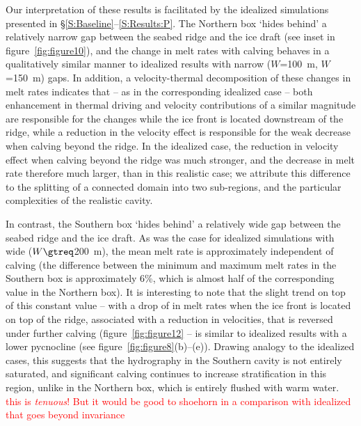 \documentclass[draft]{agujournal2019}
\newcommand{\red}[1]{\textcolor{red}{#1}}
\begin{document}
Our interpretation of these results is facilitated by the idealized simulations presented in \S\ref{S:Baseline}--\ref{S:Results:P}. The Northern box `hides behind' a relatively narrow gap between the seabed ridge and the ice draft (see inset in figure~\ref{fig:figure10}), and the change in melt rates with calving behaves in a qualitatively similar manner to idealized results with narrow ($W$=100~m, $W$=150~m) gaps. In addition, a velocity-thermal decomposition of these changes in melt rates indicates that -- as in the corresponding idealized case -- both enhancement in thermal driving and velocity contributions of a similar magnitude are responsible for the changes while the ice front is located downstream of the ridge, while a reduction in the velocity effect is responsible for the weak decrease when calving beyond the ridge. In the idealized case, the reduction in velocity effect when calving beyond the ridge was much stronger, and the decrease in melt rate therefore much larger, than in this realistic case; we attribute this difference to the splitting of a connected domain into two sub-regions, and the particular complexities of the realistic cavity.

In contrast, the Southern box `hides behind' a relatively wide gap between the seabed ridge and the ice draft. As was the case for idealized simulations with wide ($W \gtreq$200~m), the mean melt rate is approximately independent of calving (the difference between the minimum and maximum melt rates in the Southern box is approximately 6\%, which is almost half of the corresponding value in the Northern box). It is interesting to note that the slight trend on top of this constant value -- with a drop of in melt rates when the ice front is located on top of the ridge, associated with a reduction in velocities, that is reversed under further calving (figure~\ref{fig:figure12} --  is similar to idealized results with a lower pycnocline (see figure~\ref{fig:figure8}(b)--(e)). Drawing analogy to the idealized cases, this suggests that the hydrography in the Southern cavity is not entirely saturated, and significant calving continues to increase stratification in this region, unlike in the Northern box, which is entirely flushed with warm water. \red{this is \textit{tenuous}! But it would be good to shoehorn in a comparison with idealized that goes beyond invariance}
\end{document}
